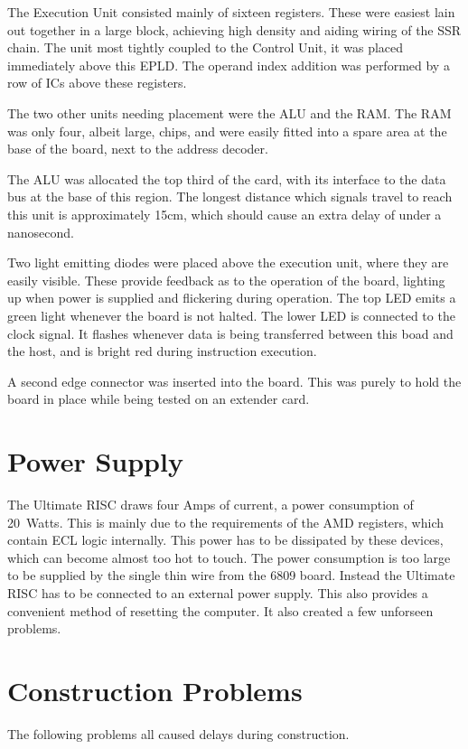 The Execution Unit consisted mainly of sixteen registers. 
These were easiest lain out together in a large block, achieving high density and aiding wiring of the SSR chain.
The unit most tightly coupled to the  Control Unit, it was placed immediately above this EPLD.
The operand index addition was performed by a row of ICs above these registers.

The two other units needing placement were the ALU and the RAM.
The RAM was only four, albeit large, chips, and were easily fitted into a spare 
area at the base of the board, next to the address decoder.

The ALU was allocated the top third of the card, with its interface to the data bus at the base of this region.
The longest distance which signals travel to reach this unit is approximately 15cm, which should cause an extra delay of under a nanosecond.

Two light emitting diodes were placed above the execution unit, where they are easily visible.
These provide feedback as to the operation of the board, lighting up when power is supplied and flickering during operation.
The top LED emits a green light whenever the board is not halted.
The lower LED is connected to the clock signal. 
It flashes whenever data is being transferred between this boad and the host, and is bright red during instruction execution.

A second edge connector was inserted into the board. 
This was purely to hold the board in place while being tested on an extender card.

\section{Power Supply}

The Ultimate RISC   draws four Amps of current, a power consumption of 20~Watts.
This is mainly due  to the requirements of the AMD registers, which contain ECL logic internally. 
This power has to be dissipated by these devices, which can become almost too hot to touch.
The power consumption is too large to be supplied by the single thin wire from the 6809 board.
Instead the Ultimate RISC has to be connected to an external power supply.
This also provides a convenient method of resetting the  computer.
It also created a few unforseen problems.

\section{Construction Problems}
The following problems all caused delays during construction.

